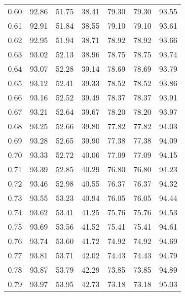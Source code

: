 \begin{tabular}{|c|c|c|c|c|c|c|}
      0.60 &     92.86 &     51.75 &      38.41 &   79.30 &      79.30 &         93.55 \\
      0.61 &     92.91 &     51.84 &      38.55 &   79.10 &      79.10 &         93.61 \\
      0.62 &     92.95 &     51.94 &      38.71 &   78.92 &      78.92 &         93.66 \\
      0.63 &     93.02 &     52.13 &      38.96 &   78.75 &      78.75 &         93.74 \\
      0.64 &     93.07 &     52.28 &      39.14 &   78.69 &      78.69 &         93.79 \\
      0.65 &     93.12 &     52.41 &      39.33 &   78.52 &      78.52 &         93.86 \\
      0.66 &     93.16 &     52.52 &      39.49 &   78.37 &      78.37 &         93.91 \\
      0.67 &     93.21 &     52.64 &      39.67 &   78.20 &      78.20 &         93.97 \\
      0.68 &     93.25 &     52.66 &      39.80 &   77.82 &      77.82 &         94.03 \\
      0.69 &     93.28 &     52.65 &      39.90 &   77.38 &      77.38 &         94.09 \\
      0.70 &     93.33 &     52.72 &      40.06 &   77.09 &      77.09 &         94.15 \\
      0.71 &     93.39 &     52.85 &      40.29 &   76.80 &      76.80 &         94.23 \\
      0.72 &     93.46 &     52.98 &      40.55 &   76.37 &      76.37 &         94.32 \\
      0.73 &     93.55 &     53.23 &      40.94 &   76.05 &      76.05 &         94.44 \\
      0.74 &     93.62 &     53.41 &      41.25 &   75.76 &      75.76 &         94.53 \\
      0.75 &     93.69 &     53.56 &      41.52 &   75.41 &      75.41 &         94.61 \\
      0.76 &     93.74 &     53.60 &      41.72 &   74.92 &      74.92 &         94.69 \\
      0.77 &     93.81 &     53.71 &      42.02 &   74.43 &      74.43 &         94.79 \\
      0.78 &     93.87 &     53.79 &      42.29 &   73.85 &      73.85 &         94.89 \\
      0.79 &     93.97 &     53.95 &      42.73 &   73.18 &      73.18 &         95.03 \\

\end{tabular}
